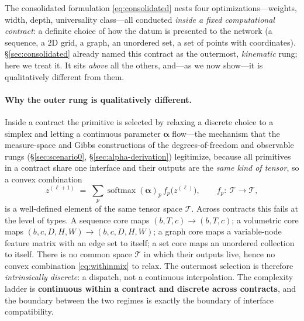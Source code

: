 \documentclass[11pt]{article}
\theoremstyle{definition}
\newcommand{\alphapar}{\bm{\alpha}}
\begin{document}
The consolidated formulation \eqref{eq:consolidated} nests four optimizations---weights, width,
depth, universality class---all conducted \emph{inside a fixed computational contract}: a definite
choice of how the datum is presented to the network (a sequence, a $2$D grid, a graph, an unordered
set, a set of points with coordinates). \S\ref{sec:consolidated} already named this contract as the
outermost, \emph{kinematic} rung; here we treat it. It sits \emph{above} all the others, and---as we now
show---it is qualitatively different from them.

\paragraph{Why the outer rung is qualitatively different.} Inside a contract the primitive is selected
by relaxing a discrete choice to a simplex and letting a continuous parameter $\alphapar$ flow---the
mechanism that the measure-space and Gibbs constructions of the degrees-of-freedom and observable rungs
(\S\ref{sec:scenario0}, \S\ref{sec:alpha-derivation}) legitimize, because
all primitives in a contract share one interface and their outputs are the \emph{same kind of tensor},
so a convex combination
\begin{equation}
z^{(\ell+1)} \;=\; \sum_{p} \operatorname{softmax}(\alphapar)_p \, f_p\!\big(z^{(\ell)}\big),
\qquad f_p:\ \mathcal{T}\to\mathcal{T},
\label{eq:withinmix}
\end{equation}
is a well-defined element of the same tensor space $\mathcal{T}$. Across contracts this fails at the
level of types. A sequence core maps $(b,T,c)\!\to\!(b,T,c)$; a volumetric core maps
$(b,c,D,H,W)\!\to\!(b,c,D,H,W)$; a graph core maps a variable-node feature matrix with an edge set to
itself; a set core maps an unordered collection to itself. There is no common space $\mathcal{T}$ in
which their outputs live, hence no convex combination \eqref{eq:withinmix} to relax. The outermost
selection is therefore \emph{intrinsically discrete}: a dispatch, not a continuous interpolation. The
complexity ladder is \textbf{continuous within a contract and discrete across contracts}, and the
boundary between the two regimes is exactly the boundary of interface compatibility.
\end{document}
